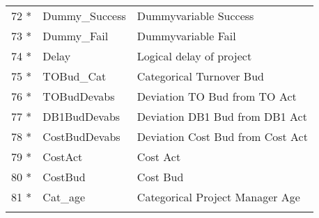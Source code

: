 \begin{longtable}[ht]{p{} p{}p{}}
72 *  & Dummy\_Success & Dummyvariable Success \\
73 *   & Dummy\_Fail & Dummyvariable Fail \\
74 *   & Delay & Logical delay of project \\
75 *   & TOBud\_Cat & Categorical Turnover Bud \\
76 *   & TOBudDevabs & Deviation TO Bud from TO Act \\
77 *   & DB1BudDevabs & Deviation DB1 Bud from DB1 Act \\
78 *   & CostBudDevabs & Deviation Cost Bud from Cost Act \\
79 *   & CostAct & Cost Act \\
80 *   & CostBud & Cost Bud \\
81 *   & Cat\_age & Categorical Project Manager Age \\
	\label{tab:addlabel}%
\end{longtable}%
\newpage

